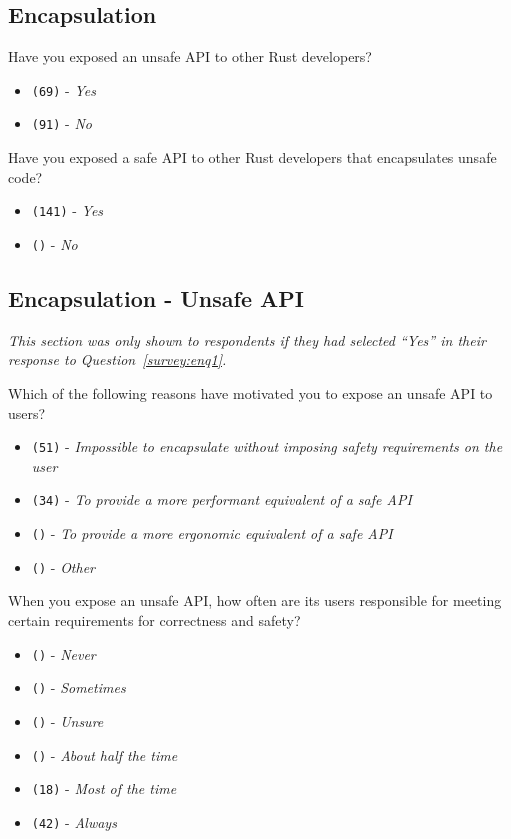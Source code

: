 \subsection{Encapsulation}
\label{survey:sec:enq}

\begin{protocol}
\item \label{survey:enq1} Have you exposed an unsafe API to other Rust developers?
\begin{itemize}
\item \texttt{(69)} - \textit{Yes}
\item \texttt{(91)} - \textit{No}
\end{itemize}
\item \label{survey:enq2} Have you exposed a safe API to other Rust developers that encapsulates unsafe code?
\begin{itemize}
\item \texttt{(141)} - \textit{Yes}
\item \texttt{()} - \textit{No}
\end{itemize}
\end{protocol}

\subsection{Encapsulation - Unsafe API}
\label{survey:sec:euaq}
\textit{This section was only shown to respondents if they had selected ``\textit{Yes}'' in their response to Question~\ref{survey:enq1}.}

\begin{protocol}
\item \label{survey:euaq1}  Which of the following reasons have motivated you to expose an unsafe API to users?
\begin{itemize}
\item \texttt{(51)} - \textit{Impossible to encapsulate without imposing safety requirements on the user}
\item \texttt{(34)} - \textit{To provide a more performant equivalent of a safe API}
\item \texttt{()} - \textit{To provide a more ergonomic equivalent of a safe API}
\item \texttt{()} - \textit{Other}
\end{itemize}
\item \label{survey:euaq2}  When you expose an unsafe API, how often are its users responsible for meeting certain requirements for correctness and safety?
\begin{itemize}
\item \texttt{()} - \textit{Never}
\item \texttt{()} - \textit{Sometimes}
\item \texttt{()} - \textit{Unsure}
\item \texttt{()} - \textit{About half the time}
\item \texttt{(18)} - \textit{Most of the time}
\item \texttt{(42)} - \textit{Always}
\end{itemize}
\end{protocol}

